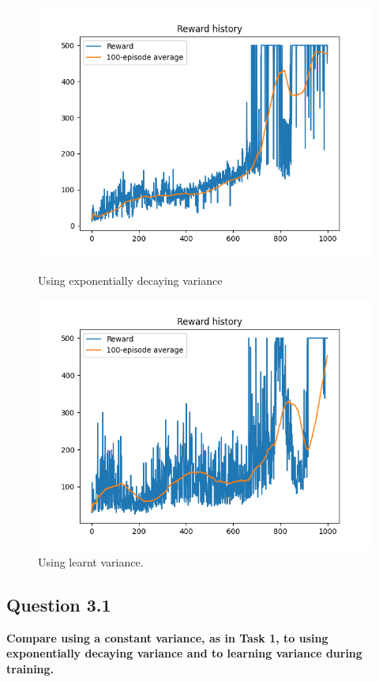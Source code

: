 \documentclass[12pt]{article}
\begin{document}
\begin{figure}[H]
    \centering
   \begin{minipage}{0.50\textwidth}
     \centering
     \includegraphics[width=0.9\linewidth]{exercise-5/plots/task-2a.png}
     \caption{Using exponentially decaying variance}
     \label{fig:task-2-a}
   \end{minipage}\hfill
   \begin{minipage}{0.50\textwidth}
     \centering
     \includegraphics[width=0.9\linewidth]{exercise-5/plots/task-2b.png}
     \caption{Using learnt variance.}
     \label{fig:task-2-b}
   \end{minipage}
\end{figure}

\subsection{Question 3.1}
\textbf{Compare using a constant variance, as in Task 1, to using exponentially decaying variance and to learning variance during training.}\\
\end{document}
